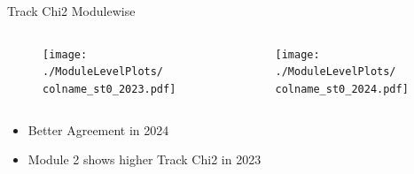 \begin{frame}{Track Chi2 Modulewise}
    \newcommand{\colname}{Track_Chi2}
    \begin{columns}
        \begin{column}{0.6\linewidth}
            \begin{figure}
                \centering
                \texttt{[image: ./ModuleLevelPlots/\\colname\_st0\_2023.pdf]}
            \end{figure}
        \end{column}
        \begin{column}{0.6\linewidth}
            \begin{figure}
                \centering
                \texttt{[image: ./ModuleLevelPlots/\\colname\_st0\_2024.pdf]}
            \end{figure}
        \end{column}
    \end{columns}

    \begin{itemize}
        \small
        \item Better Agreement in 2024 
        \item Module 2 shows higher Track Chi2 in 2023
    \end{itemize}
\end{frame}

